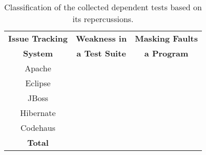 \begin{table}
\centering
\setlength{\tabcolsep}{0.95\tabcolsep}
\begin{tabular}{|c||c|c|}
\hline
\textbf{Issue Tracking} & \textbf{Weakness in} & \textbf{Masking Faults} \\
\textbf{System } & \textbf{a Test Suite} & \textbf{a Program} \\
\hline
Apache & &  \\
\hline
Eclipse & &  \\
\hline
JBoss& &  \\
\hline
Hibernate & & \\
\hline
Codehaus & & \\
\hline
\hline
\textbf{Total}  & & \\
\hline
\end{tabular}
\caption{
Classification of the collected dependent tests
based on its repercussions.
}
\label{tab:reper}
\end{table}
